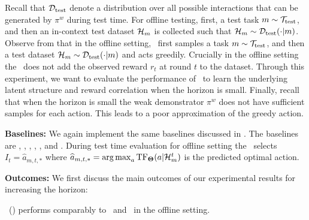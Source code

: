 







Recall that $\mathcal{D}_{\text{test}}$ denote a distribution over all possible interactions that can be generated by $\pi^w$ during test time. 
%
%
%
%
For offline testing, first, a test task $m\sim\mathcal{T}_{\text{test}}$, and then an in-context test dataset $\mathcal{H}_m$ is collected such that $\mathcal{H}_m\sim\mathcal{D}_{\text{test}}(\cdot|m)$. 
%
% 
Observe from  that in the offline setting, \pred\ first samples a task $m\sim\mathcal{T}_{\text{test}}$, and then a test dataset $\mathcal{H}_m\sim \mathcal{D}_{\text{test}}(\cdot|m)$ and acts greedily. 
%
Crucially in the offline setting the 
\pred\ does not add the observed reward $r_t$ at round $t$ to the dataset.
%
Through this experiment, we want to evaluate the performance of \pred\ to learn the underlying latent structure and reward correlation when the horizon is small.
%
Finally, recall that when the horizon is small the weak demonstrator $\pi^w$ does not have sufficient samples for each action. This leads to a poor approximation of the greedy action. 


%


\textbf{Baselines:} We again implement the same baselines discussed in . The baselines are \pred, \predt, \dptg, \ad, \ts, and \linucb. During test time evaluation for offline setting the \dpt\ selects $I_t =  \widehat{a}_{m,t,*}$ where $\widehat{a}_{m,t,*} = \mathop{\rm arg\,max}_a \mathrm{TF}_{\mathbf{\Theta}}(a|\mathcal{H}^t_m)$ is the predicted optimal action. 


\textbf{Outcomes:} We first discuss the main outcomes of our experimental results for increasing the horizon:

\begin{tcolorbox}
\customfinding  \pred\ (\gt) performs comparably to \dptg\ and \ad\ in the offline setting. 
\end{tcolorbox}


